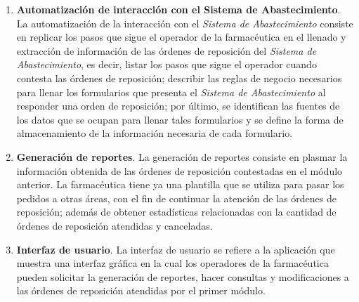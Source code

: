 \begin{enumerate}
\item \textbf{Automatización de interacción con el Sistema de Abastecimiento}. La automatización de la interacción con el \textit{Sistema de Abastecimiento} consiste en replicar los pasos que sigue el operador de la farmacéutica en el llenado y extracción de información de las órdenes de reposición del \textit{Sistema de Abastecimiento}, es decir, listar los pasos que sigue el operador cuando contesta las órdenes de reposición; describir las reglas de negocio necesarios para llenar los formularios que presenta el \textit{Sistema de Abastecimiento} al responder una orden de reposición; por último, se identifican las fuentes de los datos que se ocupan para llenar tales formularios y se define la forma de almacenamiento de la información necesaria de cada formulario.
\item \textbf{Generación de reportes}. La generación de reportes consiste en plasmar la información obtenida de las órdenes de reposición contestadas en el módulo anterior. La farmacéutica tiene ya una plantilla que se utiliza para pasar los pedidos a otras áreas, con el fin de continuar la atención de las órdenes de reposición; además de obtener estadísticas relacionadas con la cantidad de órdenes de reposición atendidas y canceladas.
\item \textbf{Interfaz de usuario}. La interfaz de usuario se refiere a la aplicación que muestra una interfaz gráfica en la cual los operadores de la farmacéutica pueden solicitar la generación de reportes, hacer consultas y modificaciones a las órdenes de reposición atendidas por el primer módulo.
\end{enumerate}
